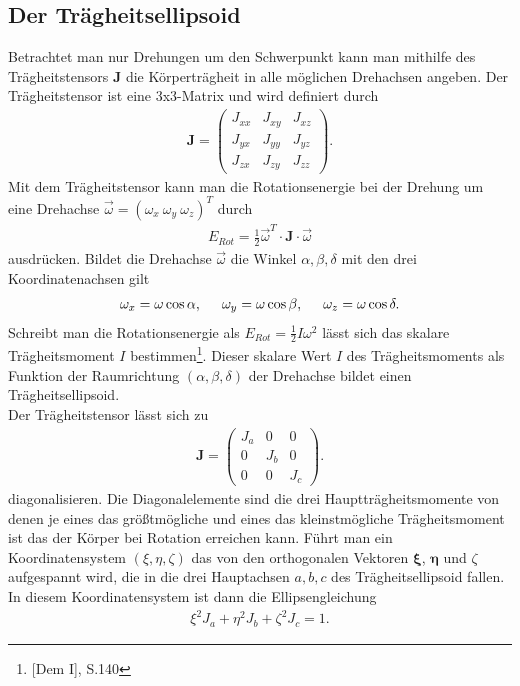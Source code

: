 \documentclass[12pt, a4paper, twoside]{scrartcl}
\begin{document}
\subsection{Der Trägheitsellipsoid}
Betrachtet man nur Drehungen um den Schwerpunkt kann man mithilfe des Trägheitstensors $\textbf{J}$ die Körperträgheit in alle möglichen Drehachsen angeben. Der Trägheitstensor ist eine 3x3-Matrix und wird definiert durch
\begin{align*}
\textbf{J}=\begin{pmatrix} J_{xx} & J_{xy} & J_{xz} \\ J_{yx} & J_{yy} & J_{yz} \\ J_{zx} & J_{zy} & J_{zz} \end{pmatrix}.
\end{align*}
Mit dem Trägheitstensor kann man die Rotationsenergie bei der Drehung um eine Drehachse $\vec\omega=(\omega_x\ \omega_y\ \omega_z)^T$ durch
\begin{align*}
E_{Rot}=\frac{1}{2}\vec\omega^T\cdot\textbf{J}\cdot\vec\omega
\end{align*}
ausdrücken. Bildet die Drehachse $\vec\omega$ die Winkel $\alpha,\beta,\delta$ mit den drei Koordinatenachsen gilt
\begin{align*}
\omega_x=\omega\cos\alpha,\hspace{0.5cm}\omega_y=\omega\cos\beta,\hspace{0.5cm}\omega_z=\omega\cos\delta.
\end{align*}
Schreibt man die Rotationsenergie als $E_{Rot}=\frac{1}{2}I\omega^2$ lässt sich das skalare Trägheitsmoment $I$ bestimmen\footnote{[Dem I], S.140}. Dieser skalare Wert $I$ des Trägheitsmoments als Funktion der Raumrichtung $(\alpha,\beta,\delta)$ der Drehachse bildet einen Trägheitsellipsoid.\\
Der Trägheitstensor lässt sich zu
\begin{align*}
\textbf{J}=\begin{pmatrix} J_{a}& 0& 0 \\ 0& J_{b} &0  \\ 0& 0& J_{c} \end{pmatrix}.
\end{align*}
diagonalisieren. Die Diagonalelemente sind die drei Hauptträgheitsmomente von denen je eines das größtmögliche und eines das kleinstmögliche Trägheitsmoment ist das der Körper bei Rotation erreichen kann. Führt man ein Koordinatensystem $(\xi,\eta,\zeta)$ das von den orthogonalen Vektoren $\mathbf\xi$, $\mathbf{\eta}$ und $\mathbb{\zeta}$ aufgespannt wird, die in die drei Hauptachsen $a,b,c$ des Trägheitsellipsoid fallen. In diesem Koordinatensystem ist dann die Ellipsengleichung
\begin{align*}
\xi^2J_a+\eta^2J_b+\zeta^2J_c=1.
\end{align*}
\end{document}
